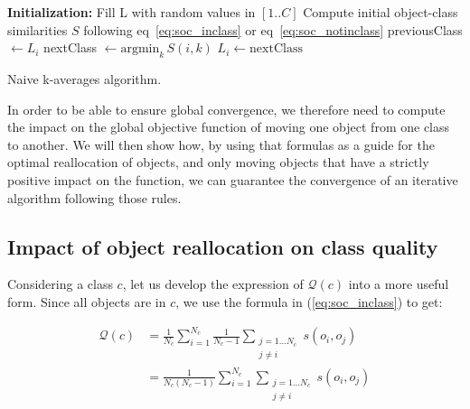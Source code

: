 \documentclass[a4paper,twoside]{article}
\begin{document}
\begin{algorithm}
	\label{algo:naive-kaverages}
	\SetAlgoLined
	\BlankLine	
	\textbf{Initialization:} 
		Fill L with random values in $[1..C]$\;
		Compute initial object-class similarities $S$ following eq~\ref{eq:soc_inclass} or eq~\ref{eq:soc_notinclass}\;
	\BlankLine	
	 {
		 {
			previousClass $\leftarrow L_i$\;
			nextClass $\leftarrow \mathrm{argmin}_k\, S(i, k)$
			 {
				$L_i \leftarrow \mathrm{nextClass}$\;
			}
		}
	}
	\BlankLine
	\caption{Naive k-averages algorithm.}
\end{algorithm}

In order to be able to ensure global convergence, we therefore need to compute the impact on the global objective function of moving one object from one class to another. We will then show how, by using that formulas as a guide for the optimal reallocation of objects, and only moving objects that have a strictly positive impact on the function, we can guarantee the convergence of an iterative algorithm following those rules.

\subsection{Impact of object reallocation on class quality}

Considering a class $c$, let us develop the expression of $\mathcal{Q}(c)$ into a more useful form. Since all objects are in $c$, we use the formula in (\ref{eq:soc_inclass}) to get:

\begin{equation}
  \begin{aligned}
    \mathcal{Q}\left(c\right) & = \frac{1}{N_c} \sum_{i=1}^{N_c} \frac{1}{N_c-1} \sum_{\substack{j=1 \ldots N_c\\j \neq i}} s\left(o_i, o_j\right) \\
                              & = \frac{1}{N_c(N_c-1)} \sum_{i=1}^{N_c} \sum_{\substack{j=1 \ldots N_c\\j \neq i}} s\left(o_i, o_j\right)
  \end{aligned}
\end{equation}
\end{document}
